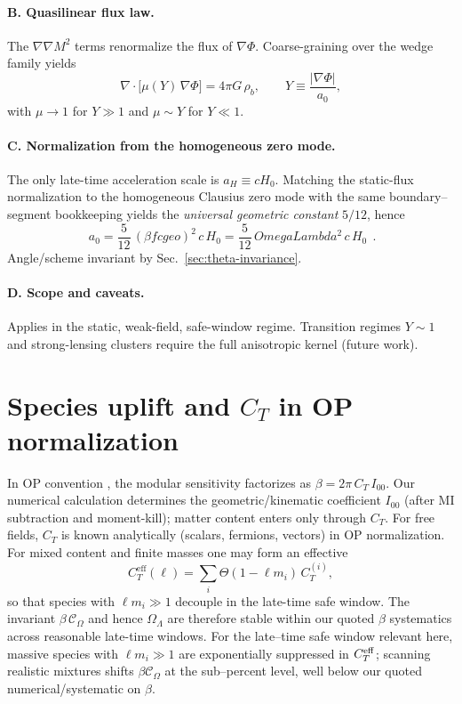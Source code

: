 \documentclass[aps,prd,onecolumn,superscriptaddress,nofootinbib]{revtex4-2}
\def\OmL{OmegaLambda}%
\def\cgeo{cgeo}%
\def\boxed#1{#1}%
\newcommand{\OmL}{\Omega_\Lambda}
\newcommand{\cgeo}{c_{\rm geo}}
\begin{document}
\paragraph*{B. Quasilinear flux law.}
The $\nabla\nabla M^2$ terms renormalize the flux of $\nabla\Phi$. Coarse-graining over the wedge family yields
\begin{equation}
\nabla\!\cdot\!\big[\mu(Y)\,\nabla\Phi\big] = 4\pi G\,\rho_b, \qquad
Y \equiv \frac{|\nabla\Phi|}{a_0},
\end{equation}
with $\mu\to 1$ for $Y\gg 1$ and $\mu\sim Y$ for $Y\ll 1$.

\paragraph*{C. Normalization from the homogeneous zero mode.}
The only late-time acceleration scale is $a_H\equiv cH_0$. Matching the static-flux normalization to the homogeneous Clausius zero mode with the same boundary--segment bookkeeping yields the \emph{universal geometric constant} $5/12$, hence
\begin{equation}
\boxed{\ a_0 = \frac{5}{12}\,(\beta f \cgeo)^2\,c\,H_0 = \frac{5}{12}\,\OmL^2\,c\,H_0\ }\ .
\end{equation}
Angle/scheme invariant by Sec.~\ref{sec:theta-invariance}.

\paragraph*{D. Scope and caveats.}
Applies in the static, weak-field, safe-window regime. Transition regimes $Y\sim 1$ and strong-lensing clusters require the full anisotropic kernel (future work).

\section{Species uplift and \(C_T\) in OP normalization}
\label{app:species}
In OP convention \cite{OsbornPetkou1994}, the modular sensitivity factorizes as \(\beta=2\pi\,C_T\,I_{00}\). Our numerical calculation determines the geometric/kinematic coefficient \(I_{00}\) (after MI subtraction and moment-kill); matter content enters only through \(C_T\). For free fields, \(C_T\) is known analytically (scalars, fermions, vectors) in OP normalization. For mixed content and finite masses one may form an effective
\[
C_T^{\mathrm{eff}}(\ell)=\sum_i \Theta(1-\ell m_i)\,C_T^{(i)},
\]
so that species with \(\ell m_i\gg 1\) decouple in the late-time safe window. The invariant \(\beta\,\mathcal C_\Omega\) and hence \(\Omega_\Lambda\) are therefore stable within our quoted \(\beta\) systematics across reasonable late-time windows. For the late–time safe window relevant here, massive species with $\ell m_i\gg 1$ are exponentially suppressed in $C_T^{\rm eff}$; scanning realistic mixtures shifts $\beta\mathcal C_\Omega$ at the sub–percent level, well below our quoted numerical/systematic on $\beta$.
\end{document}

